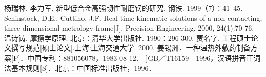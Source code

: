 

\renewcommand\refname{参\quad 考\quad 文\quad 献}
\begin{thebibliography}{1}
 杨瑞林, 李力军. 新型低合金高强韧性耐磨钢的研究. 钢铁. 1999（7）：41~45.
  Schinstock, D.E., Cuttino, J.F. Real time kinematic solutions of a non-contacting, three dimensional metrology frame[J]. Precision Engineering. 2000, 24(1):70-76. 
 温诗铸. 摩擦学原理. 北京：清华大学出版社. 1990：296-300.
 贾名字. 工程硕士论文撰写规范[硕士论文].上海:上海交通大学. 2000.
 姜锡洲．一种温热外敷药制备方案[P]．中国专利：881056078，1983-08-12．
]GB／T16159—1996，汉语拼音正词法基本规则[S]．北京：中国标准出版社，1996．
\end{thebibliography}


\newpage